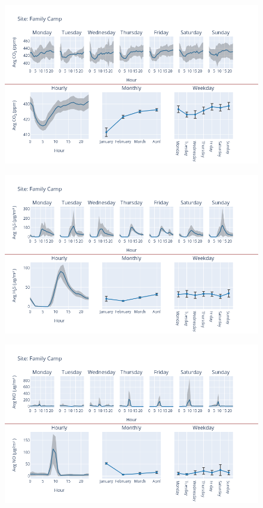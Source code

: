 \documentclass[12pt, oneside]{book}
\begin{document}
{ 
{\begin{figure}[H] 
 \centering 
\includegraphics[width=.88\textwidth, keepaspectratio]{image80} 
 \end{figure}}{} 

{\begin{figure}[H] 
 \centering 
\includegraphics[width=.88\textwidth, keepaspectratio]{image81} 
 \end{figure}}{} 

{\begin{figure}[H] 
 \centering 
\includegraphics[width=.88\textwidth, keepaspectratio]{image82} 
 \end{figure}}{} 

}
\end{document}
